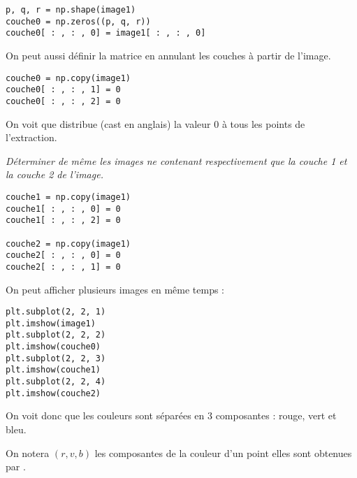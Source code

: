 \begin{lstlisting}
p, q, r = np.shape(image1)
couche0 = np.zeros((p, q, r))
couche0[ : , : , 0] = image1[ : , : , 0]
\end{lstlisting}

On peut aussi définir la matrice en annulant les couches à partir de l'image.

\begin{lstlisting}
couche0 = np.copy(image1)
couche0[ : , : , 1] = 0
couche0[ : , : , 2] = 0
\end{lstlisting}
On voit que  distribue ({\sc cast} en anglais) la valeur 0 à tous les points de l'extraction.
\begin{Exercise}\it Déterminer de même les images ne contenant respectivement que la couche 1 et la couche 2 de l'image.
\end{Exercise}
\begin{Answer}
\begin{lstlisting}
couche1 = np.copy(image1)
couche1[ : , : , 0] = 0
couche1[ : , : , 2] = 0

couche2 = np.copy(image1)
couche2[ : , : , 0] = 0
couche2[ : , : , 1] = 0
\end{lstlisting}
\end{Answer}
On peut afficher plusieurs images en même temps :
\begin{lstlisting}
plt.subplot(2, 2, 1) 
plt.imshow(image1)
plt.subplot(2, 2, 2) 
plt.imshow(couche0)
plt.subplot(2, 2, 3) 
plt.imshow(couche1)
plt.subplot(2, 2, 4) 
plt.imshow(couche2)
\end{lstlisting}

On voit donc que les couleurs sont séparées en 3 composantes : rouge, vert et bleu.

On notera $(r,v,b)$ les composantes de la couleur d'un point elles sont obtenues par .
